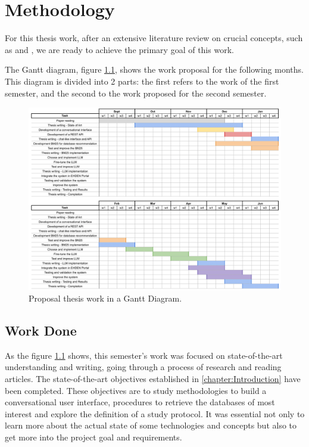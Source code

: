 \chapter{Methodology}
\label{chapter:Methodology}

For this thesis work, after an extensive literature review on crucial concepts, such as {\ir} and {\llm}, we are ready to achieve the primary goal of this work.

The Gantt diagram, figure \ref{fig_gantt}, shows the work proposal for the following months. This diagram is divided into 2 parts: the first refers to the work of the first semester, and the second to the work proposed for the second semester.

\begin{figure}[ht]
    \includegraphics[width=16cm]{figs/chapter3/diagram_gantt.png}
    \centering
    \caption{Proposal thesis work in a Gantt Diagram.}
    \label{fig_gantt}
\end{figure}


\section{Work Done}

As the figure \ref{fig_gantt} shows, this semester's work was focused on state-of-the-art understanding and writing, going through a process of research and reading articles. The state-of-the-art objectives established in \autoref{chapter:Introduction} have been completed. These objectives are to study methodologies to build a conversational user interface, procedures to retrieve the databases of most interest and explore the definition of a study protocol. It was essential not only to learn more about the actual state of some technologies and concepts but also to get more into the project goal and requirements.

